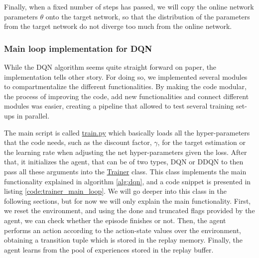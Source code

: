 Finally, when a fixed number of steps has passed, we will copy the online network parameters $\theta$ onto the target network, so that the distribution of the parameters from the target network do not diverge too much from the online network.

\subsubsection{Main loop implementation for DQN}
While the DQN algorithm seems quite straight forward on paper, the implementation tells other story. For doing so, we implemented several modules to compartmentalize the different functionalities. By making the code modular, the process of improving the code, add new functionalities and connect different modules was easier, creating a pipeline that allowed to test several training set-ups in parallel.

The main script is called \href{https://github.com/Javimh18/DL_TFM/blob/main/src/train.py}{train.py} which basically loads all the hyper-parameters that the code needs, such as the discount factor, $\gamma$, for the target estimation or the learning rate when adjusting the net hyper-parameters given the loss. After that, it initializes the agent, that can be of two types, DQN or DDQN to then pass all these arguments into the \href{https://github.com/Javimh18/DL_TFM/blob/main/src/trainer.py}{Trainer} class. This class implements the main functionality explained in algorithm \ref{alg:dqn}, and a code snippet is presented in listing \ref{code:trainer_main_loop}. We will go deeper into this class in the following sections, but for now we will only explain the main functionality. First, we reset the environment, and using the done and truncated flags provided by the agent, we can check whether the episode finishes or not. Then, the agent performs an action according to the action-state values over the environment, obtaining a transition tuple which is stored in the replay memory. Finally, the agent learns from the pool of experiences stored in the replay buffer.

